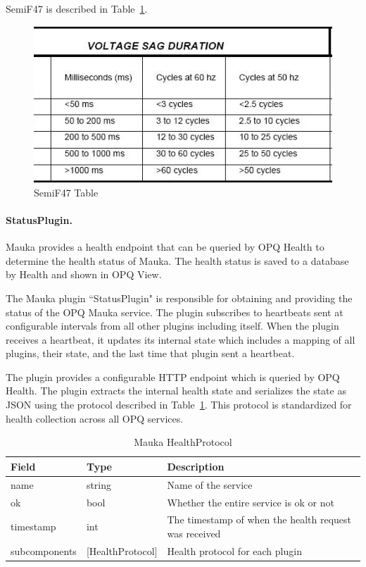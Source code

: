 SemiF47 is described in Table~\ref{fig:SemiF47Table}.

\begin{figure}
	\centering
	\includegraphics[width=0.6\linewidth]{figures/semif47_table.jpg}
	\caption{SemiF47 Table}
	\label{fig:SemiF47Table}
\end{figure}


\paragraph{StatusPlugin.}
Mauka provides a health endpoint that can be queried by OPQ Health to determine the health status of Mauka. The health status is saved to a database by Health and shown in OPQ View.

The Mauka plugin ``StatusPlugin" is responsible for obtaining and providing the status of the OPQ Mauka service. The plugin subscribes to heartbeats sent at configurable intervals from all other plugins including itself. When the plugin receives a heartbeat, it updates its internal state which includes a mapping of all plugins, their state, and the last time that plugin sent a heartbeat.

The plugin provides a configurable HTTP endpoint which is queried by OPQ Health. The plugin extracts the internal health state and serializes the state as JSON using the protocol described in Table~\ref{table:HealthProtocol}. This protocol is standardized for health collection across all OPQ services.

\begin{table}[H]
	\centering
	\caption{Mauka HealthProtocol}
	\begin{tabularx}{\textwidth}{llX}
		\toprule
		\textbf{Field} & \textbf{Type} & \textbf{Description} \\
		\midrule
		name & string & Name of the service \\
		ok & bool & Whether the entire service is ok or not \\
		timestamp & int & The timestamp of when the health request was received \\
		subcomponents & [HealthProtocol] & Health protocol for each plugin \\
		\bottomrule
	\end{tabularx}
	\label{table:HealthProtocol}
\end{table}

